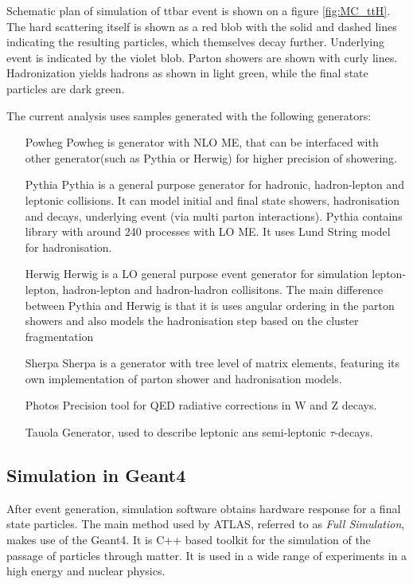 Schematic plan of simulation of ttbar event is shown on a figure \ref{fig:MC_ttH}. The hard scattering itself is shown as a red blob with the solid and dashed lines indicating the resulting particles, which themselves decay further. 
Underlying event is indicated by the violet blob. 
Parton showers are shown with curly lines.
Hadronization yields hadrons as shown in light green, while the final state particles are dark green.

The current analysis uses samples generated with the following generators:
\begin{itemize}[align=left]
\item[Powheg]Powheg is generator with NLO ME, that can be interfaced with other generator(such as Pythia or Herwig) for higher precision of showering.
\item[Pythia] Pythia is a general purpose generator for hadronic, hadron-lepton and leptonic collisions. It can model initial and final state showers, hadronisation and decays, underlying event (via multi parton interactions). Pythia contains library with around 240 processes with LO ME. It uses Lund String model for hadronisation.
\item[Herwig] Herwig is a LO general purpose event generator for simulation lepton-lepton, hadron-lepton and hadron-hadron collisitons. The main difference between Pythia and Herwig is that it is uses angular ordering in the parton showers and also models the hadronisation step based on the cluster fragmentation
\item[Sherpa] Sherpa is a generator with tree level of matrix elements, featuring its own implementation of parton shower and hadronisation models.
\item[Photos] Precision tool for QED radiative corrections in W and Z decays.
\item[Tauola] Generator, used to describe leptonic ans semi-leptonic $\tau$-decays.
\end{itemize}

\subsection{Simulation in Geant4}

After event generation, simulation software obtains hardware response for a final state particles. The main method used by ATLAS, referred to as \textit{Full Simulation}, makes use of the Geant4\cite{Geant4}. It is C++ based toolkit for the simulation of the passage of particles through matter. It is used in a wide range of experiments in a high energy and nuclear physics.

